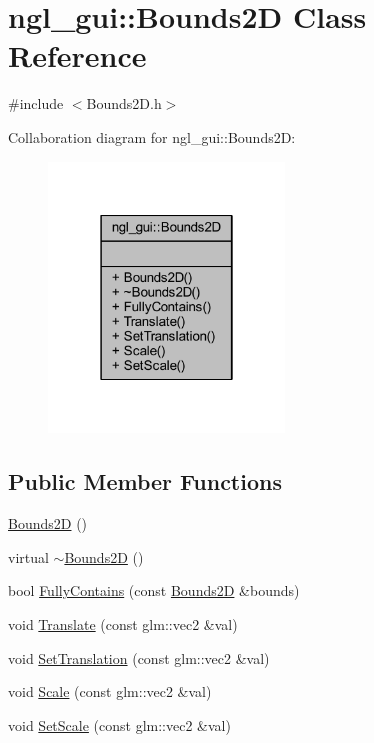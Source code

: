 \hypertarget{classngl__gui_1_1_bounds2_d}{}\section{ngl\+\_\+gui\+:\+:Bounds2D Class Reference}
\label{classngl__gui_1_1_bounds2_d}


{\ttfamily \#include $<$Bounds2\+D.\+h$>$}



Collaboration diagram for ngl\+\_\+gui\+:\+:Bounds2D\+:\nopagebreak
\begin{figure}[H]
\begin{center}
\leavevmode
\includegraphics[width=178pt]{classngl__gui_1_1_bounds2_d__coll__graph}
\end{center}
\end{figure}
\subsection*{Public Member Functions}
\begin{DoxyCompactItemize}
\item 
\mbox{\hyperlink{classngl__gui_1_1_bounds2_d_a4e70541988d6a2125c03ac2f5f8700a3}{Bounds2D}} ()
\item 
virtual \mbox{\hyperlink{classngl__gui_1_1_bounds2_d_a660706507adf515494e5d90572f4d2ec}{$\sim$\+Bounds2D}} ()
\item 
bool \mbox{\hyperlink{classngl__gui_1_1_bounds2_d_a79aa9cec12a3492a892b6384581c11b7}{Fully\+Contains}} (const \mbox{\hyperlink{classngl__gui_1_1_bounds2_d}{Bounds2D}} \&bounds)
\item 
void \mbox{\hyperlink{classngl__gui_1_1_bounds2_d_ae194f1a4c97b962c45354af32b54e439}{Translate}} (const glm\+::vec2 \&val)
\item 
void \mbox{\hyperlink{classngl__gui_1_1_bounds2_d_ad0aa8c5230b5986564f1bfdec2c19883}{Set\+Translation}} (const glm\+::vec2 \&val)
\item 
void \mbox{\hyperlink{classngl__gui_1_1_bounds2_d_a1fbdca184f173b6b274069df064b0dee}{Scale}} (const glm\+::vec2 \&val)
\item 
void \mbox{\hyperlink{classngl__gui_1_1_bounds2_d_a79ecc23f1d8fa2bc72b02c94ec562bc3}{Set\+Scale}} (const glm\+::vec2 \&val)
\end{DoxyCompactItemize}


